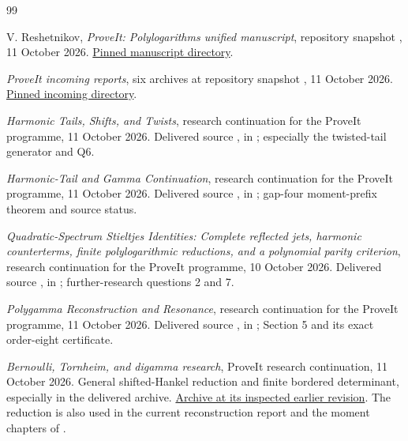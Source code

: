 \begin{thebibliography}{99}

V. Reshetnikov, \emph{ProveIt: Polylogarithms unified manuscript},
repository snapshot \shortpin, 11 October 2026.
\href{https://github.com/VladimirReshetnikov/ProveIt/tree/73f18ef013d5b74eafc883efb2c15210642df12a/Analysis/Polylogarithms/docs/manuscript}{Pinned manuscript directory}.

\emph{ProveIt incoming reports}, six archives at repository snapshot
\shortpin, 11 October 2026.
\href{https://github.com/VladimirReshetnikov/ProveIt/tree/73f18ef013d5b74eafc883efb2c15210642df12a/docs/incoming}{Pinned incoming directory}.

\emph{Harmonic Tails, Shifts, and Twists}, research continuation for the
ProveIt programme, 11 October 2026. Delivered source
,
in \cite{Incoming}; especially the twisted-tail generator and Q6.

\emph{Harmonic-Tail and Gamma Continuation}, research continuation for
the ProveIt programme, 11 October 2026. Delivered source
,
in \cite{Incoming}; gap-four moment-prefix theorem and source status.

\emph{Quadratic-Spectrum Stieltjes Identities: Complete reflected jets,
harmonic counterterms, finite polylogarithmic reductions, and a
polynomial parity criterion}, research continuation for the ProveIt
programme, 10 October 2026. Delivered source
,
in \cite{Incoming}; further-research questions 2 and 7.

\emph{Polygamma Reconstruction and Resonance}, research continuation for
the ProveIt programme, 11 October 2026. Delivered source
,
in \cite{Incoming}; Section 5 and its exact order-eight certificate.

\emph{Bernoulli, Tornheim, and digamma research}, ProveIt research
continuation, 11 October 2026. General shifted-Hankel reduction and
finite bordered determinant, especially
 in the delivered archive.
\href{https://github.com/VladimirReshetnikov/ProveIt/blob/446dca9bd65c20e409d1d2561d4ffad408103e2a/docs/incoming/ProveIt_Bernoulli_Tornheim_Digamma_2026-10-11.zip}{Archive at its inspected earlier revision}.
The reduction is also used in the current reconstruction report
\cite{PRR} and the moment chapters of \cite{ProveIt}.


\end{thebibliography}
